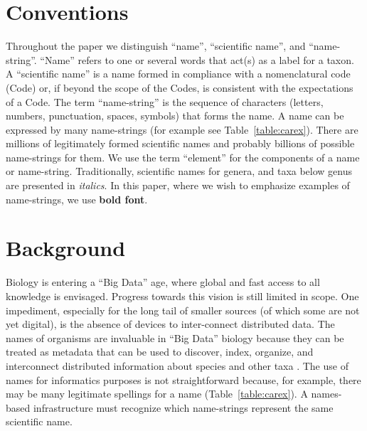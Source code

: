 \documentclass{bmcart}
\begin{document}


\section*{Conventions}

Throughout the paper we distinguish ``name'', ``scientific name'', and
``name-string''. ``Name'' refers to one or several words that act(s) as a
label for a taxon. A ``scientific name'' is a name formed in compliance with a
nomenclatural code (Code) or, if beyond the scope of the Codes, is consistent
with the expectations of a Code. The term ``name-string'' is the sequence of
characters (letters, numbers, punctuation, spaces, symbols) that forms the
name. A name can be expressed by many name-strings (for example see
Table~\ref{table:carex}). There are millions of legitimately formed scientific
names and probably billions of possible name-strings for them. We use the term
``element'' for the components of a name or name-string. Traditionally,
scientific names for genera, and taxa below genus are presented in
\textit{italics}. In this paper, where we wish to emphasize examples of
name-strings, we use \textbf{bold font}.

\section*{Background}

Biology is entering a ``Big Data'' age, where global and fast access to all
knowledge is envisaged. Progress towards this vision is still limited in
scope. One impediment, especially for the long tail of smaller sources (of
which some are not yet digital), is the absence of devices to inter-connect
distributed data. The names of organisms are invaluable in ``Big Data''
biology because they can be treated as metadata that can be used to discover,
index, organize, and interconnect distributed information about species and
other taxa \cite{Patterson2010}. The use of names for informatics purposes is
not straightforward because, for example, there may be many legitimate
spellings for a name (Table~\ref{table:carex}). A names-based infrastructure
must recognize which name-strings represent the same scientific name.
\end{document}

